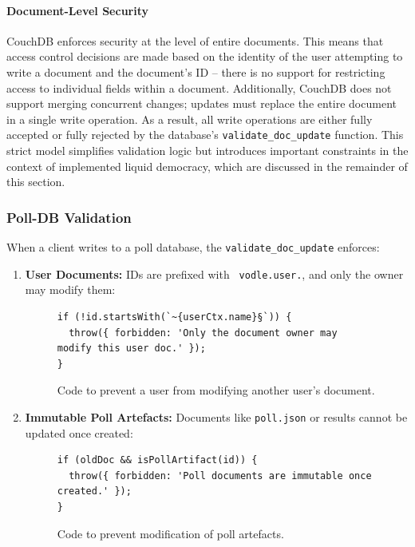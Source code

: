 \paragraph{Document-Level Security}
CouchDB enforces security at the level of entire documents. This means that access control decisions are made based on the identity of the user attempting to write a document and the document's ID -- there is no support for restricting access to individual fields within a document. Additionally, CouchDB does not support merging concurrent changes; updates must replace the entire document in a single write operation. As a result, all write operations are either fully accepted or fully rejected by the database's \texttt{validate\_doc\_update} function. This strict model simplifies validation logic but introduces important constraints in the context of implemented liquid democracy, which are discussed in the remainder of this section.

\subsubsection{Poll-DB Validation}
When a client writes to a poll database, the \texttt{validate\_doc\_update} enforces:

\begin{enumerate}
  \item \textbf{User Documents:} IDs are prefixed with \texttt{~vodle.user.}, and only the owner may modify them:
\begin{figure}[H]
  \centering
\begin{verbatim}
if (!id.startsWith(`~{userCtx.name}§`)) {
  throw({ forbidden: 'Only the document owner may modify this user doc.' });
}
\end{verbatim}
\caption{Code to prevent a user from modifying another user's document.}
\end{figure}

  \item \textbf{Immutable Poll Artefacts: } Documents like \texttt{poll.json} or results cannot be updated once created:
\begin{figure}[H]
    \begin{verbatim}
if (oldDoc && isPollArtifact(id)) {
  throw({ forbidden: 'Poll documents are immutable once created.' });
}
    \end{verbatim}
\caption{Code to prevent modification of poll artefacts.}
\end{figure}
\end{enumerate}

